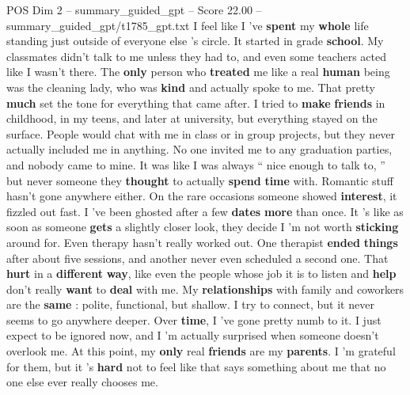\begin{textsample}{POS Dim 2 – summary\_guided\_gpt – Score 22.00 – summary\_guided\_gpt/t1785\_gpt.txt}  \label{ex:f2_pos_018}
I feel like I ’ve \textbf{spent} my \textbf{whole} life standing just outside of everyone else ’s circle.
It started in grade \textbf{school}.
My classmates didn't talk to me unless they had to, and even some teachers acted like I wasn't there.
The \textbf{only} person who \textbf{treated} me like a real \textbf{human} being was the cleaning lady, who was \textbf{kind} and actually spoke to me.
That pretty \textbf{much} set the tone for everything that came after.
I tried to \textbf{make} \textbf{friends} in childhood, in my teens, and later at university, but everything stayed on the surface.
People would chat with me in class or in group projects, but they never actually included me in anything.
No one invited me to any graduation parties, and nobody came to mine.
It was like I was always “ nice enough to talk to, ” but never someone they \textbf{thought} to actually \textbf{spend} \textbf{time} with.
Romantic stuff hasn't gone anywhere either.
On the rare occasions someone showed \textbf{interest}, it fizzled out fast.
I ’ve been ghosted after a few \textbf{dates} \textbf{more} than once.
It ’s like as soon as someone \textbf{gets} a slightly closer look, they decide I ’m not worth \textbf{sticking} around for.
Even therapy hasn't really worked out.
One therapist \textbf{ended} \textbf{things} after about five sessions, and another never even scheduled a second one.
That \textbf{hurt} in a \textbf{different} \textbf{way}, like even the people whose job it is to listen and \textbf{help} don't really \textbf{want} to \textbf{deal} with me.
My \textbf{relationships} with family and coworkers are the \textbf{same} : polite, functional, but shallow.
I try to connect, but it never seems to go anywhere deeper.
Over \textbf{time}, I ’ve gone pretty numb to it.
I just expect to be ignored now, and I ’m actually surprised when someone doesn't overlook me.
At this point, my \textbf{only} real \textbf{friends} are my \textbf{parents}.
I ’m grateful for them, but it ’s \textbf{hard} not to feel like that says something about me that no one else ever really chooses me.

\end{textsample}
